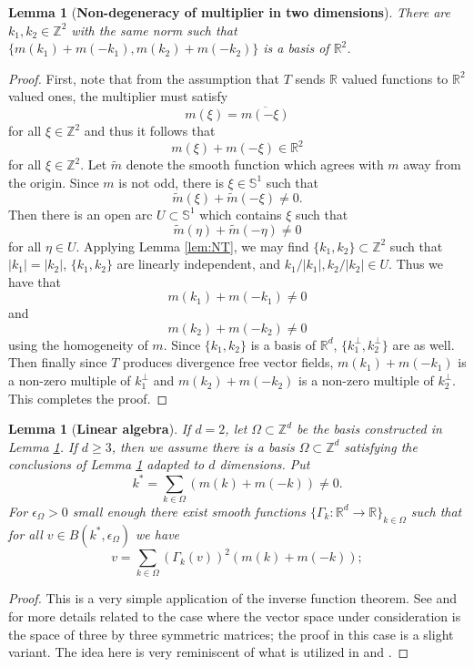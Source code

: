 \documentclass[12pt,reqno,letterpaper]{amsart}
\numberwithin{equation}{section}
\newcommand{\1}{{\bf 1}}
\newcommand{\2}{{\bf 2}}
\newcommand{\R}{\mathbb R}
\newcommand{\Z}{\mathbb Z}
\newtheorem{lemma}[theorem]{Lemma}
\theoremstyle{remark}
\theoremstyle{remark}
\begin{document}
\begin{lemma}[\textbf{Non-degeneracy of multiplier in two dimensions}]\label{lem:nondegen}
    There are $k_1,k_2 \in \Z^2$ with the same norm such that $\{m(k_1) + m(-k_1), m(k_2) + m(-k_2)\}$ is a basis of $\R^2$.
\end{lemma}
\begin{proof}
    First, note that from the assumption that $T$ sends $\R$ valued functions to $\R^2$ valued ones, the multiplier must satisfy
    $$
    m(\xi) = \overline{m(-\xi)}
    $$
    for all $\xi \in \Z^2$ and thus it follows that
    $$
    m(\xi) + m(-\xi) \in \R^2
    $$
    for all $\xi \in \Z^2$. Let $\tilde{m}$ denote the smooth function which agrees with $m$ away from the origin. Since $m$ is not odd, there is $\xi \in \mathbb{S}^1$ such that
    $$
    \tilde{m}(\xi) + \tilde{m}(-\xi) \not = 0.
    $$
    Then there is an open arc $U \subset \mathbb{S}^1$ which contains $\xi$ such that
    $$
    \tilde{m}(\eta) + \tilde{m}(-\eta) \not=0 
    $$
    for all $\eta \in U$. Applying Lemma \ref{lem:NT}, we may find $\{k_1,k_2\} \subset \Z^2$ such that $|k_1| = |k_2|$, $\{k_1,k_2\}$ are linearly independent, and $k_1/|k_1|, k_2/|k_2| \in U$. Thus we have that
    $$
    m(k_1) + m(-k_1) \not = 0
    $$
    and
    $$
    m(k_2) + m(-k_2) \not= 0
    $$
    using the homogeneity of $m$. Since $\{k_1,k_2\}$ is a basis of $\R^d$, $\{k_1^\perp,k_2^\perp\}$ are as well. Then finally since $T$ produces divergence free vector fields, $m(k_1) + m(-k_1)$ is a non-zero multiple of $k_1^\perp$ and $m(k_2) + m(-k_2)$ is a non-zero multiple of $k_2^\perp$. This completes the proof.
\end{proof}



\begin{lemma}[\textbf{Linear algebra}]\label{lem:lin_alg}
    If $d = 2$, let $\Omega \subset \Z^d$ be the basis constructed in Lemma \ref{lem:nondegen}. If $d \geq 3$, then we assume there is a basis $\Omega \subset \Z^d$ satisfying the conclusions of Lemma \ref{lem:nondegen} adapted to $d$ dimensions. Put
    $$
    k^* = \sum_{k \in \Omega} \left(m(k) + m(-k)\right) \not = 0.
    $$
    For $\epsilon_{\Omega} > 0$ small enough there exist smooth functions $\{\Gamma_k : \R^d \to \R\}_{k \in \Omega}$ such that for all $v \in B(k^*,\epsilon_{\Omega})$ we have
        $$
        v = \sum_{k \in \Omega} \left(\Gamma_k(v)\right)^2 \left(m(k) + m(-k)\right);
        $$
\end{lemma}
\begin{proof}
This is a very simple application of the inverse function theorem. See \cite[Proposition 5.6]{BV2020} and \cite[Lemma 3.2]{DLS13} for more details related to the case where the vector space under consideration is the space of three by three symmetric matrices; the proof in this case is a slight variant. The idea here is very reminiscent of what is utilized in \cite[Section 2.1]{IV} and \cite[Lemma 2.1]{DW}.
\end{proof}
\end{document}
